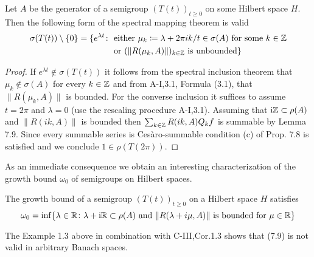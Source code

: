 \begin{theorem}\label{thm:a3-7.10}
Let $A$ be the generator of a semigroup $(T(t))_{t\geq 0}$ on some Hilbert space $H$.
Then the following form of the spectral mapping theorem is valid
\begin{align*}
\sigma(T(t))\setminus\{0\} = \{e^{\lambda t} \colon
& \text{ either } \mu_{k}\coloneqq \lambda + 2\pi i k/t \in \sigma(A) \text{ for some } k \in \mathbb{Z}\\
& \text{ or } (\|R(\mu_{k},A)\|)_{k\in\mathbb{Z}} \text{ is unbounded}\}
\end{align*}
\end{theorem}
\begin{proof}
If $e^{\lambda t} \not\in \sigma(T(t))$ it follows from the spectral inclusion theorem that $\mu_{k} \not\in \sigma(A)$ for every $k \in \mathbb{Z}$ and from A-I,3.1, Formula (3.1), that $\|R(\mu_{k},A)\|$ is bounded.
For the converse inclusion it suffices to assume $t = 2\pi$ and $\lambda = 0$ (use the rescaling procedure A-I,3.1).
Assuming that $\mathrm{i}\mathbb{Z} \subset \rho(A)$ and $\|R(ik,A)\|$ is bounded then $\sum_{k\in\mathbb{Z}} R(ik,A)Q_{k}f$ is summable by Lemma 7.9.
Since every summable series is Cesàro-summable condition (c) of Prop. 7.8 is satisfied and we conclude $1 \in \rho(T(2\pi))$.
\end{proof}
As an immediate consequence we obtain an interesting characterization of the growth bound $\omega_{0}$ of semigroups on Hilbert spaces.
\begin{corollary}\label{cor:a3-7.11}
The growth bound of a semigroup $(T(t))_{t\geq 0}$ on a Hilbert space $H$ satisfies
\begin{equation}\label{eq:a3-7.9}
\omega_{0} = \inf \{\lambda \in \mathbb{R} \colon \lambda + \mathrm{i}\mathbb{R} \subset \rho(A) \text{ and } \|R(\lambda+i\mu,A)\| \text{ is bounded for } \mu \in \mathbb{R}\}
\end{equation}
\end{corollary}
The Example 1.3 above in combination with C-III,Cor.1.3 shows that (7.9) is not valid in arbitrary Banach spaces.

